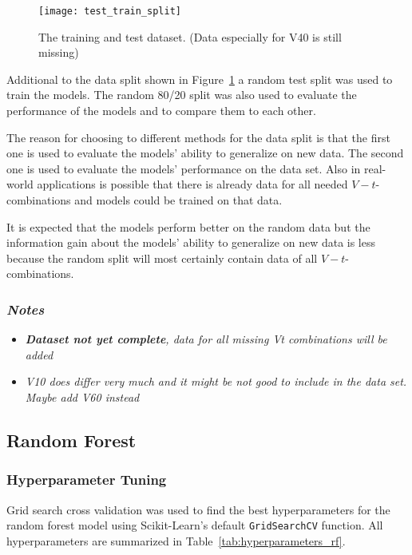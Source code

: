 \begin{figure}[H]
    \begin{tcolorbox}[arc=0pt,boxrule=0.5pt]
        \centering
        \texttt{[image: test\_train\_split]}
        \caption{The training and test dataset. (Data especially for V40 is still missing)}
        \label{fig:train_test_split}
    \end{tcolorbox}
\end{figure}

Additional to the data split shown in Figure~\ref{fig:train_test_split} a random test split was
used to train the
models. The random 80/20 split was also used to evaluate the performance of the models and to
compare them to each
other.

The reason for choosing to different methods for the data split is that the first one is used to
evaluate the models'
ability to generalize on new data. The second one is used to evaluate the models' performance on
the data set.
Also in real-world applications is possible that there is already data for all needed
$V-t$-combinations and models
could be trained on that data.

It is expected that the models perform better on the random data but the information gain about
the models' ability
to generalize on new data is less because the random split will most certainly contain data of
all $V-t$-combinations.


\subsubsection*{\textit{Notes}}
\begin{itemize}
    \item \textit{\textbf{Dataset not yet complete}, data for all missing Vt combinations will be
    added}
    \item \textit{V10 does differ very much and it might be not good to include in the data set.
    Maybe add V60 instead}
\end{itemize}

\subsection{Random Forest}

\subsubsection*{Hyperparameter Tuning}
Grid search cross validation was used to find the best hyperparameters for the random forest
model using
Scikit-Learn's default \texttt{GridSearchCV} function.
All hyperparameters are summarized in Table~\ref{tab:hyperparameters_rf}.

